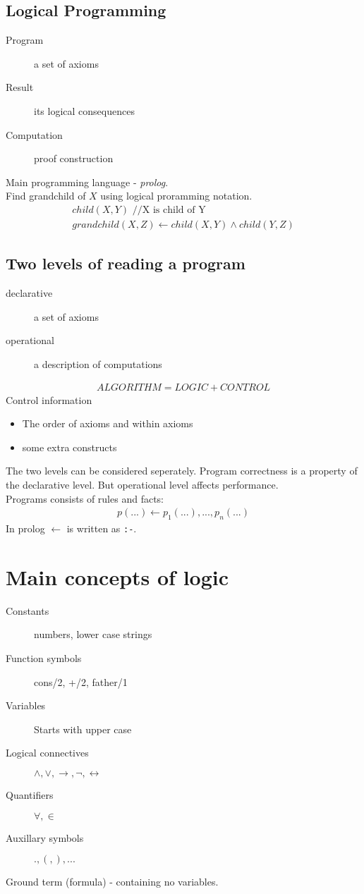 \documentclass[a4paper]{article}
\begin{document}
\subsection{Logical Programming}
\begin{description}
\item[Program] a set of axioms
\item[Result] its logical consequences
\item[Computation] proof construction
\end{description}
Main programming language - \textit{prolog}.\\

Find grandchild of $X$ using logical proramming notation.
\begin{align}
  child(X,Y)  \mbox{ //X is child of Y}\\
  grandchild(X,Z) \leftarrow child(X,Y) \land child(Y,Z)
\end{align}

\subsection{Two levels of reading a program}
\begin{description}
\item[declarative] a set of axioms
\item[operational] a description of computations
\end{description}
\begin{align}
 ALGORITHM = LOGIC + CONTROL 
\end{align}
Control information
\begin{itemize}
\item The order of axioms and within axioms
\item some extra constructs
\end{itemize}
The two levels can be considered seperately. Program correctness is a property
of the declarative level. But operational level affects performance.
\\
Programs consists of rules and facts:
\begin{align}
  p(...)\leftarrow p_1(...),...,p_n(...)
\end{align}
In prolog $\leftarrow$ is written as \texttt{:-}.\\

\section{Main concepts of logic}
\begin{description}
\item[Constants] numbers, lower case strings
\item[Function symbols] cons/2, +/2, father/1
\item[Variables] Starts with upper case
\item[Logical connectives] $\land, \lor, \rightarrow, \lnot, \leftrightarrow$
\item[Quantifiers] $\forall, \in$
\item[Auxillary symbols] $.,(,),...$
\end{description}

Ground term (formula) - containing no variables.\\
\end{document}
